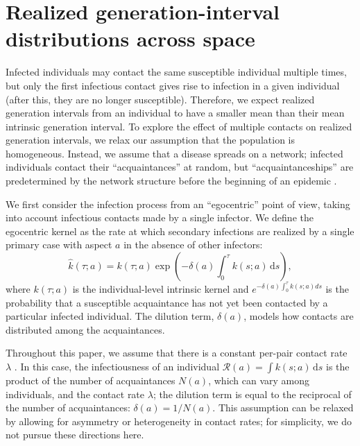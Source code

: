 \documentclass[12pt]{article}
\newcommand{\RR}{\ensuremath{{\mathcal R}}}
\begin{document}
\section{Realized generation-interval distributions across space}

Infected individuals may contact the same susceptible individual multiple times, but only the first infectious contact gives rise to infection in a given individual (after this, they are no longer susceptible).
Therefore, we expect realized generation intervals from an individual to have a smaller mean than their mean intrinsic generation interval.
To explore the effect of multiple contacts on realized generation intervals, we relax our assumption that the population is homogeneous.
Instead, we assume that a disease spreads on a network;
infected individuals contact their ``acquaintances'' at random, but ``acquaintanceships'' are predetermined by the network structure before the beginning of an epidemic \cite{trapman2016inferring}.

We first consider the infection process from an ``egocentric'' point of view, taking into account infectious contacts made by a single infector.
We define the egocentric kernel as the rate at which secondary infections are realized by a single primary case with aspect $a$ in the absence of other infectors:
\begin{equation}
\hat{k}(\tau; a) = k(\tau; a) \exp \left(- \delta(a) \int_0^\tau k(s; a) \,\mathrm{d}s\right),
\end{equation}
where $k(\tau; a)$ is the individual-level intrinsic kernel and $e^{- \delta(a) \int_0^\tau k(s; a) ds}$ is the probability that a susceptible acquaintance has not yet been contacted by a particular infected individual.
The dilution term, $\delta(a)$, models how contacts are distributed among the acquaintances.

Throughout this paper, we assume that there is a constant per-pair contact rate $\lambda$ \cite{trapman2016inferring}.
In this case, the infectiousness of an individual $\RR(a) = \int k(s; a) \,\mathrm{d}s$ is the product of the number of acquaintances $N(a)$, which can vary among individuals, and the contact rate $\lambda$; the dilution term is equal to the reciprocal of the number of acquaintances: $\delta(a) = 1/N(a)$.
This assumption can be relaxed by allowing for asymmetry \citep{trapman2016inferring} or heterogeneity \citep{ball1997epidemics, ball2002general} in contact rates; 
for simplicity, we do not pursue these directions here.
\end{document}
